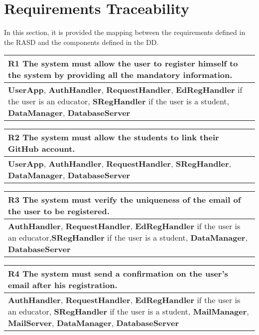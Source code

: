 \chapter{Requirements Traceability}
In this section, it is provided the mapping between the requirements defined in the RASD and the components defined in the DD.

\begin{table}[H]
    \begin{tabularx}{\textwidth}{X}
        \toprule
        \textbf{R1} The system must allow the user to register himself to the system by providing all the mandatory information. \\ \midrule
        \textbf{UserApp}, \textbf{AuthHandler}, \textbf{RequestHandler}, \textbf{EdRegHandler} if the user is an educator, \textbf{SRegHandler} if the user is a student,
        \textbf{DataManager}, \textbf{DatabaseServer} \\
    \end{tabularx}
\end{table}

\begin{table}[H]
    \begin{tabularx}{\textwidth}{X}
        \toprule
        \textbf{R2} The system must allow the students to link their GitHub account. \\ \midrule
        \textbf{UserApp}, \textbf{AuthHandler}, \textbf{RequestHandler}, \textbf{SRegHandler}, \textbf{DataManager}, \textbf{DatabaseServer} \\                  
    \end{tabularx}
\end{table}

\begin{table}[H]
    \begin{tabularx}{\textwidth}{X}
        \toprule
        \textbf{R3} The system must verify the uniqueness of the email of the user to be registered. \\ \midrule
        \textbf{AuthHandler}, \textbf{RequestHandler}, \textbf{EdRegHandler} if the user is an educator,\textbf{SRegHandler} if the user is a student, \textbf{DataManager},
        \textbf{DatabaseServer} \\                   
    \end{tabularx}
\end{table}

\begin{table}[H]
    \begin{tabularx}{\textwidth}{X}
        \toprule
        \textbf{R4} The system must send a confirmation on the user's email after his registration. \\ \midrule
        \textbf{AuthHandler}, \textbf{RequestHandler}, \textbf{EdRegHandler} if the user is an educator, \textbf{SRegHandler} if the user is a student,
        \textbf{MailManager}, \textbf{MailServer}, \textbf{DataManager}, \textbf{DatabaseServer} \\                    
    \end{tabularx}
\end{table}

